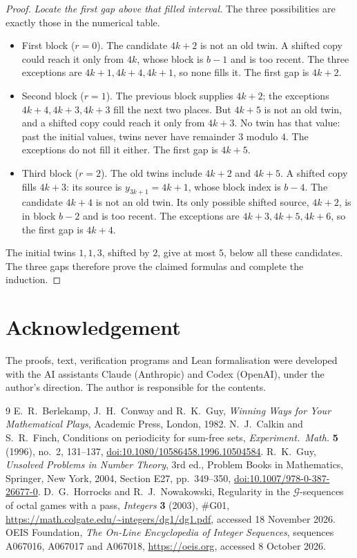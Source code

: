 \documentclass[11pt]{amsart}
\theoremstyle{remark}
\begin{document}
\begin{proof}
\emph{Locate the first gap above that filled interval.} The three possibilities are exactly those in the numerical table.
\begin{itemize}
\item First block ($r=0$). The candidate $4k+2$ is not an old twin. A shifted copy could reach it only from $4k$, whose block is $b-1$ and is too recent. The three exceptions are $4k+1,4k+4,4k+1$, so none fills it. The first gap is $4k+2$.
\item Second block ($r=1$). The previous block supplies $4k+2$; the exceptions $4k+4,4k+3,4k+3$ fill the next two places. But $4k+5$ is not an old twin, and a shifted copy could reach it only from $4k+3$. No twin has that value: past the initial values, twins never have remainder $3$ modulo $4$. The exceptions do not fill it either. The first gap is $4k+5$.
\item Third block ($r=2$). The old twins include $4k+2$ and $4k+5$. A shifted copy fills $4k+3$: its source is $y_{3k+1}=4k+1$, whose block index is $b-4$. The candidate $4k+4$ is not an old twin. Its only possible shifted source, $4k+2$, is in block $b-2$ and is too recent. The exceptions are $4k+3,4k+5,4k+6$, so the first gap is $4k+4$.
\end{itemize}
The initial twins $1,1,3$, shifted by $2$, give at most $5$, below all these candidates. The three gaps therefore prove the claimed formulas and complete the induction.
\end{proof}

\section*{Acknowledgement}

The proofs, text, verification programs and Lean formalisation were developed with the AI assistants Claude (Anthropic) and Codex (OpenAI), under the author's direction. The author is responsible for the contents.

{\small
\begin{thebibliography}{9}
 E.~R.~Berlekamp, J.~H.~Conway and R.~K.~Guy, \emph{Winning Ways for Your Mathematical Plays}, Academic Press, London, 1982.
 N.~J.~Calkin and S.~R.~Finch, Conditions on periodicity for sum-free sets, \emph{Experiment.\ Math.} \textbf{5} (1996), no.~2, 131--137, \href{https://doi.org/10.1080/10586458.1996.10504584}{doi:10.1080/10586458.1996.10504584}.
 R.~K.~Guy, \emph{Unsolved Problems in Number Theory}, 3rd ed., Problem Books in Mathematics, Springer, New York, 2004, Section E27, pp.~349--350, \href{https://doi.org/10.1007/978-0-387-26677-0}{doi:10.1007/978-0-387-26677-0}.
 D.~G.~Horrocks and R.~J.~Nowakowski, Regularity in the $\mathcal{G}$-sequences of octal games with a pass, \emph{Integers} \textbf{3} (2003), \#G01, \url{https://math.colgate.edu/~integers/dg1/dg1.pdf}, accessed 18 November 2026.
 OEIS Foundation, \emph{The On-Line Encyclopedia of Integer Sequences}, sequences A067016, A067017 and A067018, \url{https://oeis.org}, accessed 8 October 2026.
\end{thebibliography}
}
\end{document}
